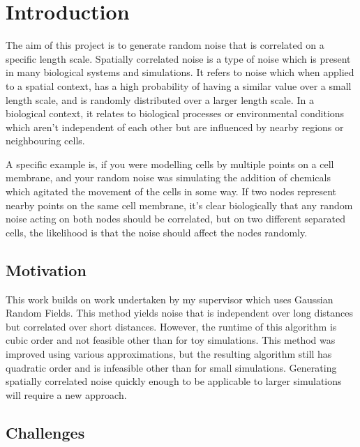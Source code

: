 \documentclass[11pt,a4paper]{article}
\begin{document}
\tableofcontents
{}
\pagebreak

\section{Introduction}

The aim of this project is to generate random noise that is correlated on a specific length scale. Spatially correlated noise \cite{spatcor} is a type of noise which is present in many biological systems and simulations. It refers to noise which when applied to a spatial context, has a high probability of having a similar value over a small length scale, and is randomly distributed over a larger length scale. In a biological context, it relates to biological processes \cite{bionoise} or environmental conditions which aren’t independent of each other but are influenced by nearby regions or neighbouring cells.

A specific example is, if you were modelling cells by multiple points on a cell membrane, and your random noise was simulating the addition of chemicals which agitated the movement of the cells in some way. If two nodes represent nearby points on the same cell membrane, it’s clear biologically that any random noise acting on both nodes should be correlated, but on two different separated cells, the likelihood is that the noise should affect the nodes randomly.

\subsection{Motivation}

This work builds on work undertaken by my supervisor \cite{fergus} which uses Gaussian Random Fields. This method yields noise that is independent over long distances but correlated over short distances. However, the runtime of this algorithm is cubic order and not feasible other than for toy simulations. This method was improved using various approximations, but the resulting algorithm still has quadratic order and is infeasible other than for small simulations. Generating spatially correlated noise quickly enough to be applicable to larger simulations will require a new approach.

\subsection{Challenges}
\end{document}

